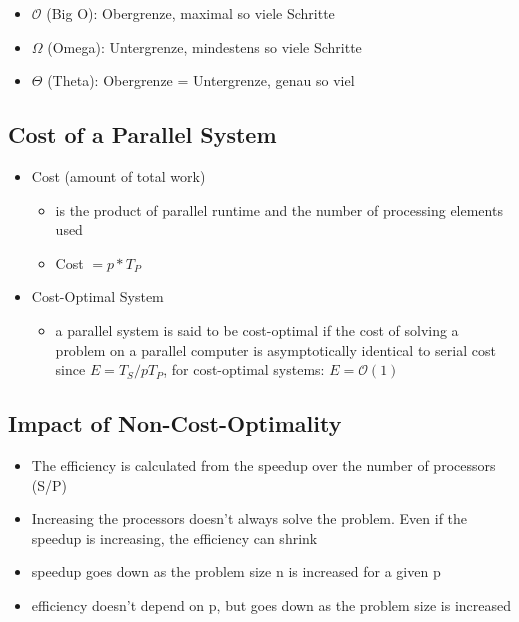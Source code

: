 \begin{itemize}
\tightlist
\item
  $\mathcal{O}$ (Big O): Obergrenze, maximal so viele Schritte
\item
  $\Omega$ (Omega): Untergrenze, mindestens so viele Schritte
\item
  $\Theta$ (Theta): Obergrenze = Untergrenze, genau so viel
\end{itemize}

\hypertarget{cost-of-a-parallel-system}{%
\subsection{Cost of a Parallel System}\label{cost-of-a-parallel-system}}

\begin{itemize}
\tightlist
\item
  Cost (amount of total work)

  \begin{itemize}
  \tightlist
  \item
    is the product of parallel runtime and the number of processing
    elements used
  \item
    Cost $= p * T_P$
  \end{itemize}
\item
  Cost-Optimal System

  \begin{itemize}
  \tightlist
  \item
    a parallel system is said to be cost-optimal if the cost of solving
    a problem on a parallel computer is asymptotically identical to
    serial cost since $E = T_S / pT_P$, for cost-optimal systems: $E = \mathcal{O}(1)$
  \end{itemize}
\end{itemize}

\hypertarget{impact-of-non-cost-optimality}{%
\subsection{Impact of
Non-Cost-Optimality}\label{impact-of-non-cost-optimality}}

\begin{itemize}
\tightlist
\item
  The efficiency is calculated from the speedup over the number of
  processors (S/P)
\item
  Increasing the processors doesn't always solve the problem. Even if
  the speedup is increasing, the efficiency can shrink
\item
  speedup goes down as the problem size n is increased for a given p
\item
  efficiency doesn't depend on p, but goes down as the problem size is
  increased
\end{itemize}

